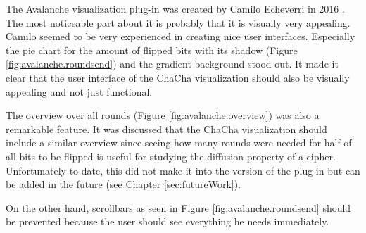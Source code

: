 The Avalanche visualization plug-in was created by Camilo Echeverri in 2016 \cite{AvalancheVisualization}. The most noticeable part about it is probably that it is visually very appealing. Camilo seemed to be very experienced in creating nice user interfaces. Especially the pie chart for the amount of flipped bits with its shadow (Figure \ref{fig:avalanche.roundsend}) and the gradient background stood out. It made it clear that the user interface of the ChaCha visualization should also be visually appealing and not just functional.

The overview over all rounds (Figure \ref{fig:avalanche.overview}) was also a remarkable feature. It was discussed that the ChaCha visualization should include a similar overview since seeing how many rounds were needed for half of all bits to be flipped is useful for studying the diffusion property of a cipher. Unfortunately to date, this did not make it into the version of the plug-in but can be added in the future (see Chapter \ref{sec:futureWork}).

On the other hand, scrollbars as seen in Figure \ref{fig:avalanche.roundsend} should be prevented because the user should see everything he needs immediately.

